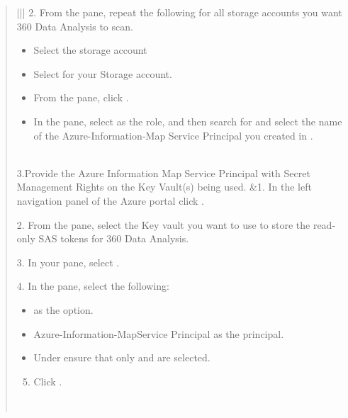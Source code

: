 \documentclass[letterpaper,10pt,english]{sphinxmanual}
\begin{document}
\begin{quote}
\begin{savenotes}
\begin{tabular}[t]{|*{2}{|}}
2. From the  pane, repeat the
following for all storage accounts you want
360 Data Analysis to scan.
\begin{itemize}
\item {} 
Select the storage account

\item {} 
Select  for your Storage
account.

\item {} 
From the  pane, click
.

\item {} 
In the  pane, select 
as the role, and then search for and select the name
of the Azure-Information-Map Service Principal
you created in .

\end{itemize}
\\
\hline
3.Provide the Azure Information
Map Service Principal with
Secret Management Rights  on the Key
Vault(s) being used.
&1. In the left navigation panel of the Azure portal
click .

2. From the  pane, select the Key vault
you want to use to store the read-only SAS tokens for
360 Data Analysis.

3. In your  pane, select
.

4. In the  pane, select the
following:
\begin{itemize}
\item {} 
 as the 
 option.

\item {} 
Azure-Information-MapService Principal as the
principal.

\item {} 
Under  ensure that only
 and  are selected.

\end{itemize}
\begin{enumerate}
\setcounter{enumi}{4}
\item {} 
Click .

\end{enumerate}
\\
\hline
\end{tabular}
\par
\sphinxattableend\end{savenotes}
\end{quote}
\end{document}
